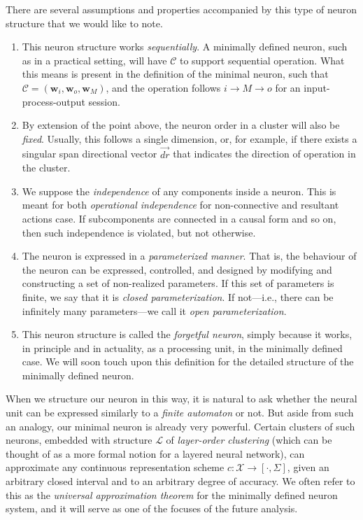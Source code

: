 There are several assumptions and properties accompanied by this type of neuron structure that we would like to note.
\begin{enumerate}[itemsep=1pt,topsep=1pt]
    \item This neuron structure works \textit{sequentially}. A minimally defined neuron, such as in a practical setting, will have $\mathcal{C}$ to support sequential operation. What this means is present in the definition of the minimal neuron, such that $\mathcal{C} = (\mathbf{w}_{i}, \mathbf{w}_{o}, \mathbf{w}_{M})$, and the operation follows $i \to M \to o$ for an input-process-output session.
    
    \item By extension of the point above, the neuron order in a cluster will also be \textit{fixed}. Usually, this follows a single dimension, or, for example, if there exists a singular span directional vector $\vec{dr}$ that indicates the direction of operation in the cluster.
    
    \item We suppose the \textit{independence} of any components inside a neuron. This is meant for both \textit{operational independence} for non-connective and resultant actions case. If subcomponents are connected in a causal form and so on, then such independence is violated, but not otherwise. 
    
    \item The neuron is expressed in a \textit{parameterized manner}. That is, the behaviour of the neuron can be expressed, controlled, and designed by modifying and constructing a set of non-realized parameters. If this set of parameters is finite, we say that it is \textit{closed parameterization}. If not—i.e., there can be infinitely many parameters—we call it \textit{open parameterization}.
    
    \item This neuron structure is called the \textit{forgetful neuron}, simply because it works, in principle and in actuality, as a processing unit, in the minimally defined case. We will soon touch upon this definition for the detailed structure of the minimally defined neuron.
\end{enumerate}

When we structure our neuron in this way, it is natural to ask whether the neural unit can be expressed similarly to a \textit{finite automaton} or not. But aside from such an analogy, our minimal neuron is already very powerful. Certain clusters of such neurons, embedded with structure $\mathcal{L}$ of \textit{layer-order clustering} (which can be thought of as a more formal notion for a layered neural network), can approximate any continuous representation scheme $c: \mathcal{X} \to [\cdot, \Sigma]$, given an arbitrary closed interval and to an arbitrary degree of accuracy. We often refer to this as the \textit{universal approximation theorem} for the minimally defined neuron system, and it will serve as one of the focuses of the future analysis.

